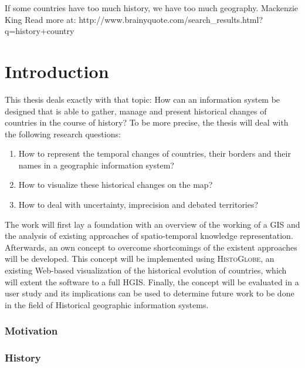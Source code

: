 

If some countries have too much history, we have too much geography. Mackenzie King
Read more at: http://www.brainyquote.com/search_results.html?q=history+country

\chapter{Introduction}
\label{cha:introduction}



This thesis deals exactly with that topic: How can an information system be designed that is able to gather, manage and present historical changes of countries in the course of history? To be more precise, the thesis will deal with the following research questions:

\begin{enumerate}
  \item How to represent the temporal changes of countries, their borders and their names in a geographic information system?
  \item How to visualize these historical changes on the map?
  \item How to deal with uncertainty, imprecision and debated territories?
\end{enumerate}

The work will first lay a foundation with an overview of the working of a GIS and the analysis of existing approaches of spatio-temporal knowledge representation. Afterwards, an own concept to overcome shortcomings of the existent approaches will be developed. This concept will be implemented using \textsc{HistoGlobe}, an existing Web-based visualization of the historical evolution of countries, which will extent the software to a full HGIS. Finally, the concept will be evaluated in a user study and its implications can be used to determine future work to be done in the field of Historical geographic information systems.

\subsection{Motivation} %
\label{sub:motivation}



\subsection{History} %
\label{sub:history}

